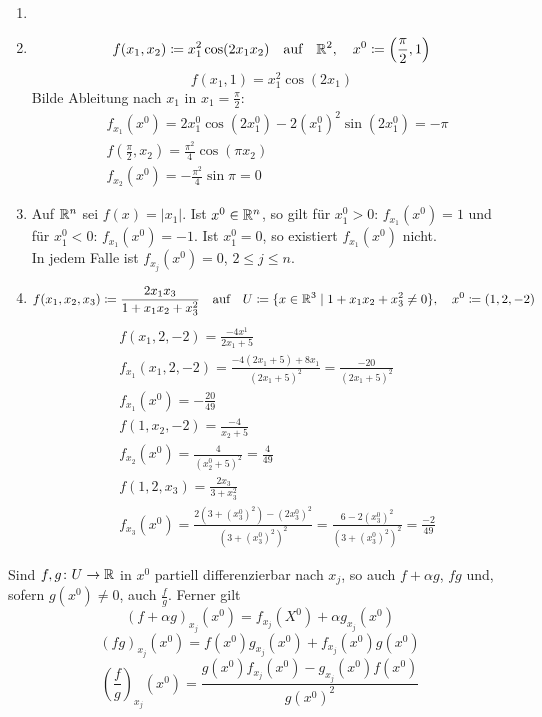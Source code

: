 \begin{beispiel*}
	\begin{enumerate}
		\item[]
		\item 	\[ f(x_1,x_2)\coloneqq x_1^2\cos(2x_1x_2)\quad\text{auf}\quad\mathbb{R}^2,\quad x^0\coloneqq\left(\frac{\pi}{2},1\right) \]
		\[ f(x_1,1)=x_1^2\cos(2x_1) \]
		Bilde Ableitung nach $ x_1 $ in $ x_1=\frac{\pi}{2} $:
		\begin{align*}
		&f_{x_1}(x^0)=2x_1^0\cos(2x_1^0)-2(x_1^0)^2\sin(2x_1^0)=-\pi\\
		&f\left(\frac{\pi}{2},x_2\right)=\frac{\pi^2}{4}\cos(\pi x_2)\\
		&f_{x_2}(x^0)=-\frac{\pi^2}{4}\sin\pi=0
		\end{align*}
		\item Auf $ \mathbb{R}^n $ sei $ f(x)=|x_1| $. Ist $ x^0\in\mathbb{R}^n $, so gilt f\"ur $ x_1^0>0 $: $ f_{x_1}(x^0)=1 $ und f\"ur $ x_1^0<0 $: $ f_{x_1}(x^0)=-1 $. Ist $ x_1^0=0 $, so existiert $ f_{x_1}(x^0) $ nicht.\\
		In jedem Falle ist $ f_{x_j}(x^0)=0 $, $ 2\leq j\leq n $.
		\item \[ f(x_1,x_2,x_3)\coloneqq\frac{2x_1x_3}{1+x_1x_2+x_3^2}\quad\text{auf}\quad U\coloneqq\lbrace x\in\mathbb{R}^3\mid 1+x_1x_2+x_3^2\neq 0\rbrace,\quad x^0\coloneqq (1,2,-2) \]
		\begin{align*}
		&f(x_1,2,-2)=\frac{-4x^1}{2x_1+5}\\
		&f_{x_1}(x_1,2,-2)=\frac{-4(2x_1+5)+8x_1}{(2x_1+5)^2}=\frac{-20}{(2x_1+5)^2}\\
		&f_{x_1}(x^0)=-\frac{20}{49}\\
		&f(1,x_2,-2)=\frac{-4}{x_2+5}\\
		&f_{x_2}(x^0)=\frac{4}{(x_2^0+5)^2}=\frac{4}{49}\\
		&f(1,2,x_3)=\frac{2x_3}{3+x_3^2}\\
		&f_{x_3}(x^0)=\frac{2(3+(x_3^0)^2)-(2x_3^0)^2}{(3+(x_3^0)^2)^2}=\frac{6-2(x_3^0)^2}{(3+(x_3^0)^2)^2}=\frac{-2}{49}
		\end{align*}
	\end{enumerate}
\end{beispiel*}
\begin{lemma}
	Sind $ f,g\colon U\rightarrow\mathbb{R} $ in $ x^0 $ partiell differenzierbar nach $ x_j $, so auch $ f+\alpha g $, $ fg $ und, sofern $ g(x^0)\neq 0 $, auch $ \frac{f}{g} $. Ferner gilt
	\[ (f+\alpha g)_{x_j}(x^0)=f_{x_j}(X^0)+\alpha g_{x_j}(x^0) \]
	\[ (fg)_{x_j}(x^0)=f(x^0)g_{x_j}(x^0)+f_{x_j}(x^0)g(x^0) \]
	\[ \left(\frac{f}{g}\right)_{x_j}(x^0)=\frac{g(x^0)f_{x_j}(x^0)-g_{x_j}(x^0)f(x^0)}{g(x^0)^2} \]
\end{lemma}
